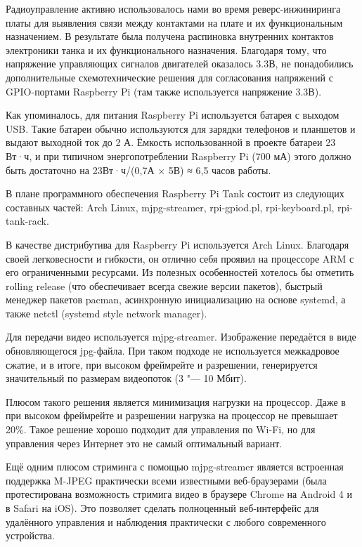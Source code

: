 \documentclass[10pt, a5paper]{article}
\begin{document}
Радиоуправление активно использовалось нами во время реверс-инжиниринга платы для выявления связи между контактами на плате и их функциональным назначением. В результате была получена распиновка внутренних контактов электроники танка и их функционального назначения. Благодаря тому, что напряжение \linebreak управляющих сигналов двигателей оказалось 3.3В, не понадобились дополнительные схемотехнические решения для согласования напряжений с GPIO-портами Raspberry Pi (там также используется напряжение 3.3В).

Как упоминалось, для питания Raspberry Pi используется батарея с выходом USB.  Такие батареи обычно используются для зарядки телефонов и планшетов и выдают выходной ток до 2 А. Ёмкость использованной в проекте батареи 23 Вт·ч, и при типичном энергопотреблении Raspberry Pi (700 мА) этого должно быть достаточно на 23Вт·ч/(0,7А × 5В) ≈ 6,5 часов работы.

В плане программного обеспечения  Raspberry Pi Tank состоит из следующих составных частей: Arch Linux, mjpg-streamer, rpi-gpiod.pl, rpi-keyboard.pl, rpi-tank-rack.

В качестве дистрибутива для Raspberry Pi используется Arch Linux. Благодаря своей легковесности и гибкости, он отлично себя проявил на процессоре ARM с его ограниченными ресурсами. Из полезных особенностей хотелось бы отметить rolling release (что обеспечивает всегда свежие версии пакетов), быстрый менеджер пакетов pacman, асинхронную инициализацию на основе systemd, а также netctl (systemd style network manager).

Для передачи видео используется mjpg-streamer. Изображение передаётся в виде обновляющегося jpg-файла. При таком подходе не используется межкадровое сжатие, и в итоге, при высоком фреймрейте и разрешении, генерируется значительный по размерам видеопоток (3 "--- 10 Мбит).

Плюсом такого решения является минимизация нагрузки на процессор. Даже в при высоком фреймрейте и разрешении нагрузка на процессор не превышает 20\%. Такое решение хорошо подходит для управления по Wi-Fi, но для управления через Интернет это не самый оптимальный вариант.

Ещё одним плюсом стриминга с помощью mjpg-streamer является встроенная поддержка M-JPEG практически всеми известными веб-браузерами (была протестирована  возможность стримига видео в браузере Chrome на Android 4 и в Safari на iOS). Это позволяет сделать полноценный веб-интерфейс для удалённого управления и наблюдения практически с любого современного устройства.
\end{document}
